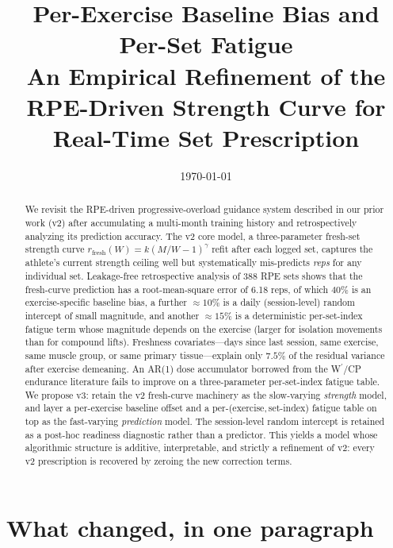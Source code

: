 \documentclass[11pt]{article}
\title{Per-Exercise Baseline Bias and Per-Set Fatigue\\[4pt]
\large An Empirical Refinement of the RPE-Driven Strength Curve for Real-Time Set Prescription}
\date{\today}
\begin{document}
\maketitle

\begin{abstract}
We revisit the RPE-driven progressive-overload guidance system described in our prior work (v2) after accumulating a multi-month training history and retrospectively analyzing its prediction accuracy.
The v2 core model, a three-parameter fresh-set strength curve $r_\mathrm{fresh}(W)=k(M/W-1)^\gamma$ refit after each logged set, captures the athlete's current strength ceiling well but systematically mis-predicts \emph{reps} for any individual set.
Leakage-free retrospective analysis of 388 RPE sets shows that the fresh-curve prediction has a root-mean-square error of 6.18 reps, of which $40\%$ is an exercise-specific baseline bias, a further $\approx 10\%$ is a daily (session-level) random intercept of small magnitude, and another $\approx 15\%$ is a deterministic per-set-index fatigue term whose magnitude depends on the exercise (larger for isolation movements than for compound lifts).
Freshness covariates---days since last session, same exercise, same muscle group, or same primary tissue---explain only $7.5\%$ of the residual variance after exercise demeaning.
An AR(1) dose accumulator borrowed from the W$^\prime$/CP endurance literature fails to improve on a three-parameter per-set-index fatigue table.
We propose v3: retain the v2 fresh-curve machinery as the slow-varying \emph{strength} model, and layer a per-exercise baseline offset and a per-(exercise,\,set-index) fatigue table on top as the fast-varying \emph{prediction} model.
The session-level random intercept is retained as a post-hoc readiness diagnostic rather than a predictor.
This yields a model whose algorithmic structure is additive, interpretable, and strictly a refinement of v2: every v2 prescription is recovered by zeroing the new correction terms.
\end{abstract}

\section{What changed, in one paragraph}
\label{sec:whatchanged}
\end{document}
